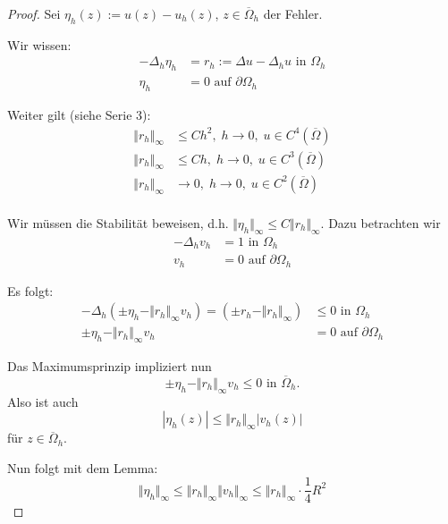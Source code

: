 \begin{proof}
Sei $\eta_h(z) := u(z) - u_h(z)$, $z \in \overline \Omega_h$ der Fehler.

Wir wissen:
\begin{align*}
- \Delta_h \eta_h &= r_h := \Delta u - \Delta_h u \text{ in } \Omega_h \\
\eta_h &= 0 \text{ auf } \partial \Omega_h
\end{align*}

Weiter gilt (siehe Serie 3):
\begin{align*}
\Vert r_h \Vert_\infty &\leq Ch^2, \; h \to 0, \; u \in C^4( \overline \Omega) \\
\Vert r_h \Vert_\infty &\leq Ch, \; h \to 0, \; u \in C^3( \overline \Omega) \\
\Vert r_h \Vert_\infty &\to 0, \; h \to 0, \; u \in C^2( \overline \Omega) \\
\end{align*}

Wir müssen die Stabilität beweisen, d.h. $\Vert \eta_h \Vert_\infty \leq C \Vert r_h \Vert_\infty$.
Dazu betrachten wir
\begin{align*}
- \Delta_h v_h &= 1 \text{ in } \Omega_h \\
v_h &= 0 \text{ auf } \partial \Omega_h 
\end{align*}

Es folgt:
\begin{align*}
- \Delta_h \left( \pm \eta_h - \Vert r_h \Vert_\infty v_h \right) = \left( \pm r_h - \Vert r_h \Vert_\infty
 \right) &\leq 0 \text{ in } \Omega_h \\
 \pm \eta_h - \Vert r_h \Vert_\infty v_h &= 0 \text{ auf } \partial \Omega_h
\end{align*}

Das Maximumsprinzip impliziert nun
\[
\pm \eta_h - \Vert r_h \Vert_\infty v_h \leq 0 \text{ in } \overline \Omega_h .
\]
Also ist auch 
\[
| \eta_h (z) | \leq \Vert r_h \Vert_\infty | v_h (z) |
\]
für $z \in \overline \Omega_h$.

Nun folgt mit dem Lemma:
\[
\Vert \eta_h \Vert_\infty \leq \Vert r_h \Vert_\infty \Vert v_h \Vert_\infty
    \leq \Vert r_h \Vert_\infty \cdot \frac 1 4 R^2
\]
\end{proof}

